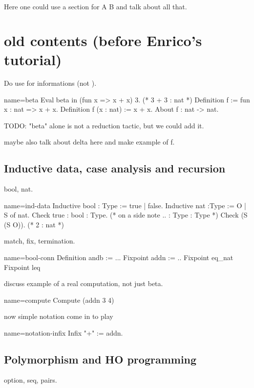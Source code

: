 Here one could use a section for A B and talk about all that.

\section{old contents (before Enrico's tutorial)}

Do use  for informations (not ).
\begin{coq}{name=beta}{}
Eval beta in (fun x => x + x) 3. (* 3 + 3 : nat *)
Definition f := fun x : nat => x + x.
Definition f (x : nat) := x + x.
About f : nat -> nat.
\end{coq}

TODO: "beta" alone is not a reduction tactic, but we could add it.

maybe also talk about delta here and make example of f.

\subsection{Inductive data, case analysis and recursion}
bool, nat.

\begin{coq}{name=ind-data}{}
Inductive bool : Type := true | false.
Inductive nat :Type := O | S of nat.
Check true : bool : Type. (* on a side note .. : Type : Type *)
Check (S (S O)). (* 2 : nat *)
\end{coq}




match, fix, termination.

\begin{coq}{name=bool-conn}{}
Definition andb := ...
Fixpoint addn := ..
Fixpoint eq_nat
Fixpoint leq
\end{coq}

discuss example of a real computation, not just beta.

\begin{coq}{name=compute}{}
Compute (addn 3 4)
\end{coq}

now simple notation come in to play

\begin{coq}{name=notation-infix}{}
Infix "+" := addn.
\end{coq}

\subsection{Polymorphism and HO programming}
option, seq, pairs.

